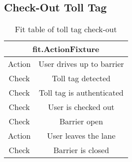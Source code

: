 \subsection{Check-Out Toll Tag}
\begin{table}
\begin{centering}
\begin{tabular}{|c|c||c||c||c|}
\hline 
\multicolumn{5}{|c|}{fit.ActionFixture}\tabularnewline
\hline 
Action & \multicolumn{4}{c|}{User drives up to barrier}\tabularnewline
\hline 
Check & \multicolumn{4}{c|}{Toll tag detected}\tabularnewline
\hline 
Check & \multicolumn{4}{c|}{Toll tag is authenticated}\tabularnewline
\hline 
Check & \multicolumn{4}{c|}{User is checked out}\tabularnewline
\hline 
Check & \multicolumn{4}{c|}{Barrier open}\tabularnewline
\hline 
Action & \multicolumn{4}{c|}{User leaves the lane}\tabularnewline
\hline 
Check & \multicolumn{4}{c|}{Barrier is closed}\tabularnewline
\hline 
\end{tabular}
\par\end{centering}

\caption{Fit table of toll tag check-out}
\end{table}
